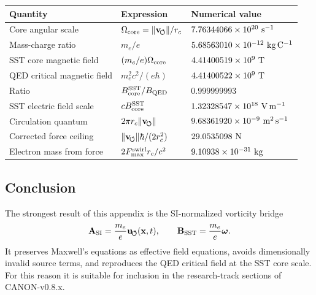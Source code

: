 \begin{center}
    \begin{tabular}{lll}
        \hline
        Quantity & Expression & Numerical value \\
        \hline
        Core angular scale &
        \(\Omega_{\rm core}=\lVert\mathbf{v}_{\!\boldsymbol{\circlearrowleft}}\rVert/r_c\) &
        \(7.76344066\times10^{20}\ {\rm s^{-1}}\) \\
        
        Mass-charge ratio &
        \(m_e/e\) &
        \(5.68563010\times10^{-12}\ {\rm kg\,C^{-1}}\) \\
        
        SST core magnetic field &
        \((m_e/e)\Omega_{\rm core}\) &
        \(4.41400519\times10^9\ {\rm T}\) \\
        
        QED critical magnetic field &
        \(m_e^2c^2/(e\hbar)\) &
        \(4.41400522\times10^9\ {\rm T}\) \\
        
        Ratio &
        \(B_{\rm core}^{\rm SST}/B_{\rm QED}\) &
        \(0.999999993\) \\
        
        SST electric field scale &
        \(cB_{\rm core}^{\rm SST}\) &
        \(1.32328547\times10^{18}\ {\rm V\,m^{-1}}\) \\
        
        Circulation quantum &
        \(2\pi r_c\lVert\mathbf{v}_{\!\boldsymbol{\circlearrowleft}}\rVert\) &
        \(9.68361920\times10^{-9}\ {\rm m^2\,s^{-1}}\) \\
        
        Corrected force ceiling &
        \(\lVert\mathbf{v}_{\!\boldsymbol{\circlearrowleft}}\rVert\hbar/(2r_c^2)\) &
        \(29.0535098\ {\rm N}\) \\
        
        Electron mass from force &
        \(2F_{\max}^{\rm swirl}r_c/c^2\) &
        \(9.10938\times10^{-31}\ {\rm kg}\) \\
        \hline
    \end{tabular}
\end{center}

\subsection{Conclusion}

The strongest result of this appendix is the SI-normalized vorticity
bridge
\[
    \mathbf{A}_{\rm SI}
    =
    \frac{m_e}{e}\mathbf{u}_{\!\boldsymbol{\circlearrowleft}}(\mathbf{x},t),
    \qquad
    \mathbf{B}_{\rm SST}
    =
    \frac{m_e}{e}\boldsymbol{\omega}.
\]
It preserves Maxwell's equations as effective field equations, avoids
dimensionally invalid source terms, and reproduces the QED critical field
at the SST core scale.  For this reason it is suitable for inclusion in
the research-track sections of CANON-v0.8.x.

